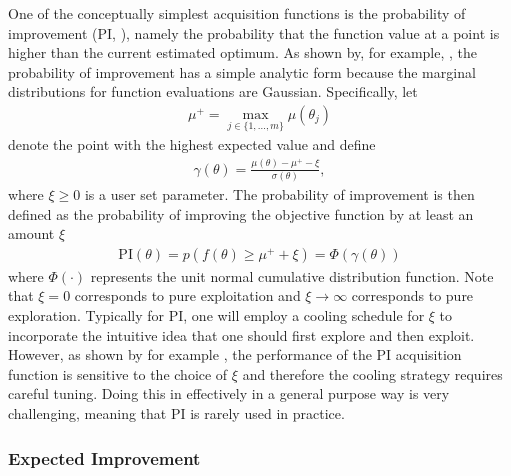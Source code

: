 One of the conceptually simplest acquisition functions is the probability of improvement (PI, \cite{kushner1964new}), namely
the probability that the function value at a point is higher than the current estimated optimum.
 As shown by, for example,
\cite{brochu2010tutorial}, the probability of improvement has a simple analytic form because the
marginal distributions for function evaluations are Gaussian.  Specifically, let
\begin{align}
\label{eq:opt:muplus}
\mu^+ = \max_{j\in \{1,\dots,m\}} \mu\left(\theta_j\right)
\end{align}
denote the point with the highest expected value and define
\begin{align}
\label{eq:opt:gamDef}
\gamma\left(\theta\right) = \frac{\mu \left(\theta\right)-\mu^+-\xi}{\sigma\left(\theta\right)},
\end{align}
where $\xi \ge 0$ is a user set parameter.
The probability of improvement is then defined as the probability of improving the 
objective function by at least an amount $\xi$
\begin{align}
\label{eq:opt:PI}
\mathrm{PI}\left(\theta\right) = p \left(f\left(\theta\right)\ge \mu^+ +\xi\right) = \Phi \left(\gamma\left(\theta\right)\right)
\end{align}
where $\Phi \left(\cdot\right)$ represents the unit normal cumulative distribution function.  
Note that $\xi=0$ corresponds to pure exploitation and $\xi \rightarrow \infty$ 
corresponds to pure exploration.  Typically for PI, one will employ a cooling schedule 
for $\xi$ to incorporate the intuitive idea that one should first explore and then 
exploit.  However, as shown by for example \cite{jones2001taxonomy}, 
the performance of the PI acquisition function is sensitive to the choice of 
$\xi$ and therefore the cooling strategy requires careful tuning.  Doing this in effectively in
a general purpose way is very challenging, meaning that PI
is rarely used in practice.

\subsubsection{Expected Improvement}
\label{sec:opt:BO:acq:expt}

